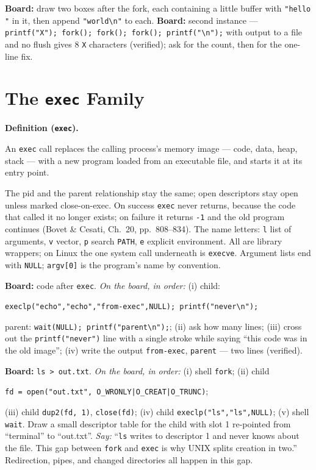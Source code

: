\documentclass[11pt]{article}
\newenvironment{definitionbox}[1]{%
  \par\noindent\textbf{Definition (#1).}\ \itshape
}{\par\vspace{0.3em}}
\begin{document}
\textbf{Board:} draw two boxes after the fork, each containing a little buffer with \texttt{"hello "} in it, then append \texttt{"world\textbackslash n"} to each. \textbf{Board:} second instance --- \texttt{printf("X"); fork(); fork(); fork(); printf("\textbackslash n");} with output to a file and no flush gives 8 \texttt{X} characters (verified); ask for the count, then for the one-line fix.

\section{The \texttt{exec} Family}

\begin{definitionbox}{\texttt{exec}}
An \texttt{exec} call replaces the calling process's memory image --- code, data, heap, stack --- with a new program loaded from an executable file, and starts it at its entry point.
\end{definitionbox}

The pid and the parent relationship stay the same; open descriptors stay open unless marked close-on-exec. On success \texttt{exec} never returns, because the code that called it no longer exists; on failure it returns \texttt{-1} and the old program continues (Bovet \& Cesati, Ch.~20, pp.~808--834). The name letters: \texttt{l} list of arguments, \texttt{v} vector, \texttt{p} search \texttt{PATH}, \texttt{e} explicit environment. All are library wrappers; on Linux the one system call underneath is \texttt{execve}. Argument lists end with \texttt{NULL}; \texttt{argv[0]} is the program's name by convention.

\textbf{Board:} code after \texttt{exec}. \emph{On the board, in order:} (i) child:
\begin{center}\texttt{execlp("echo","echo","from-exec",NULL); printf("never\textbackslash n");}\end{center}
\noindent parent: \texttt{wait(NULL); printf("parent\textbackslash n");}; (ii) ask how many lines; (iii) cross out the \texttt{printf("never")} line with a single stroke while saying ``this code was in the old image''; (iv) write the output \texttt{from-exec}, \texttt{parent} --- two lines (verified).

\textbf{Board:} \texttt{ls > out.txt}. \emph{On the board, in order:} (i) shell \texttt{fork}; (ii) child
\begin{center}\texttt{fd = open("out.txt", O\_WRONLY|O\_CREAT|O\_TRUNC)};\end{center}
\noindent (iii) child \texttt{dup2(fd, 1)}, \texttt{close(fd)}; (iv) child \texttt{execlp("ls","ls",NULL)}; (v) shell \texttt{wait}. Draw a small descriptor table for the child with slot 1 re-pointed from ``terminal'' to ``out.txt''. \emph{Say:} ``\texttt{ls} writes to descriptor 1 and never knows about the file. This gap between \texttt{fork} and \texttt{exec} is why UNIX splits creation in two.'' Redirection, pipes, and changed directories all happen in this gap.
\end{document}
